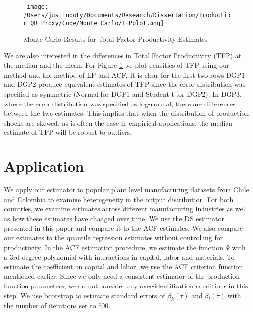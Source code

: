 \documentclass[11pt]{article}
\begin{document}
\begin{figure}[H]
\centering
\caption{Monte Carlo Results for Total Factor Productivity Estimates}
\texttt{[image: /Users/justindoty/Documents/Research/Dissertation/Production\_QR\_Proxy/Code/Monte\_Carlo/TFPplot.png]}
\label{fig:MCTFP}
\end{figure}

We are also interested in the differences in Total Factor Productivity (TFP) at the median and the mean. For Figure \ref{fig:MCTFP} we plot densities of TFP using our method and the method of LP and ACF. It is clear for the first two rows DGP1 and DGP2 produce equivalent estimates of TFP since the error distribution was specified as symmetric (Normal for DGP1 and Student-t for DGP2). In DGP3, where the error distribution was specified as log-normal, there are differences between the two estimates. This implies that when the distribution of production shocks are skewed, as is often the case in empirical applications, the median estimate of TFP will be robust to outliers. 

\section{Application} \label{application}
We apply our estimator to popular plant level manufacturing datasets from Chile and Colombia to examine heterogeneity in the output distribution. For both countries, we examine estimates across different manufacturing industries as well as how these estimates have changed over time. We use the DS estimator presented in this paper and compare it to the ACF estimates. We also compare our estimates to the quantile regression estimates without controlling for productivity. In the ACF estimation procedure, we estimate the function $\Phi$ with a 3rd degree polynomial with interactions in capital, labor and materials. To estimate the coefficient on capital and labor, we use the ACF criterion function mentioned earlier. Since we only need a consistent estimator of the production function parameters, we do not consider any over-identification conditions in this step. We use bootstrap to estimate standard errors of $\beta_{k}(\tau)$ and $\beta_{l}(\tau)$ with the number of iterations set to $500$.
\end{document}
